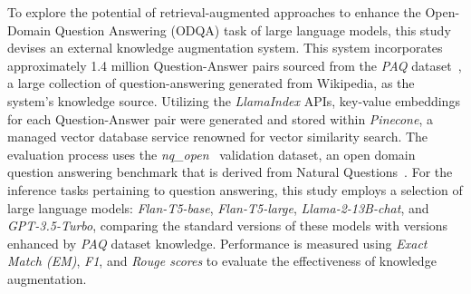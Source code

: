 To explore the potential of retrieval-augmented approaches to enhance the Open-Domain Question Answering (ODQA) task of large language models, this study devises an external knowledge augmentation system. This system incorporates approximately 1.4 million Question-Answer pairs sourced from the \emph{PAQ} dataset~\citep{paq}, a large collection of question-answering generated from Wikipedia, as the system’s knowledge source. Utilizing the \emph{LlamaIndex} APIs, key-value embeddings for each Question-Answer pair were generated and stored within \emph{Pinecone}, a managed vector database service renowned for vector similarity search. The evaluation process uses the \emph{nq\_open}~\citep{doi:10.1162/tacl-a-00276, lee-etal-2019-latent} validation dataset, an open domain question answering benchmark that is derived from Natural Questions~\citep{lee-etal-2019-latent}. For the inference tasks pertaining to question answering, this study employs a selection of large language models: \emph{Flan-T5-base}, \emph{Flan-T5-large}, \emph{Llama-2-13B-chat}, and \emph{GPT-3.5-Turbo}, comparing the standard versions of these models with versions enhanced by \emph{PAQ} dataset knowledge. Performance is measured using \emph{Exact Match (EM)}, \emph{F1}, and \emph{Rouge scores} to evaluate the effectiveness of knowledge augmentation.
